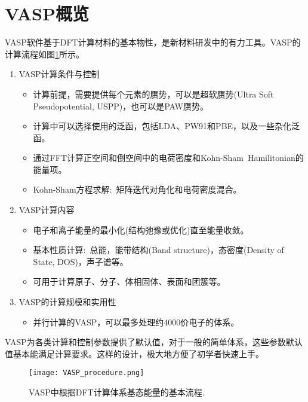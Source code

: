 \section{VASP概览}
\textrm{VASP}软件基于\textrm{DFT}计算材料的基本物性，是新材料研发中的有力工具。\textrm{VASP}的计算流程如图\ref{Fig:VASP_procedure}所示。
\begin{enumerate}
	\item \textrm{VASP}计算条件与控制
		\begin{itemize}
			\item 计算前提，需要提供每个元素的赝势，可以是超软赝势(\textrm{Ultra Soft Pseudopotential, USPP})，也可以是\textrm{PAW}赝势。
			\item 计算中可以选择使用的泛函，包括\textrm{LDA}、\textrm{PW91}和\textrm{PBE}，以及一些杂化泛函。
			\item 通过\textrm{FFT}计算正空间和倒空间中的电荷密度和\textrm{Kohn-Sham~Hamilitonian}的能量项。
			\item \textrm{Kohn-Sham}方程求解:~矩阵迭代对角化和电荷密度混合。
		\end{itemize}
	\item \textrm{VASP}计算内容
		\begin{itemize}
			\item 电子和离子能量的最小化(结构弛豫或优化)直至能量收敛。
			\item 基本性质计算:~总能，能带结构(\textrm{Band structure})，态密度(\textrm{Density of State, DOS})，声子谱等。
			\item 可用于计算原子、分子、体相固体、表面和团簇等。
		\end{itemize}
	\item \textrm{VASP}的计算规模和实用性
		\begin{itemize}
			\item 并行计算的\textrm{VASP}，可以最多处理约4000价电子的体系。
		\end{itemize}
\end{enumerate}

\textrm{VASP}为各类计算和控制参数提供了默认值，对于一般的简单体系，这些参数默认值基本能满足计算要求。这样的设计，极大地方便了初学者快速上手。
\begin{figure}[h!]
\centering
\texttt{[image: VASP\_procedure.png]}
\caption{\small \textrm{VASP}中根据\textrm{DFT}计算体系基态能量的基本流程.}%
\label{Fig:VASP_procedure}
\end{figure}

